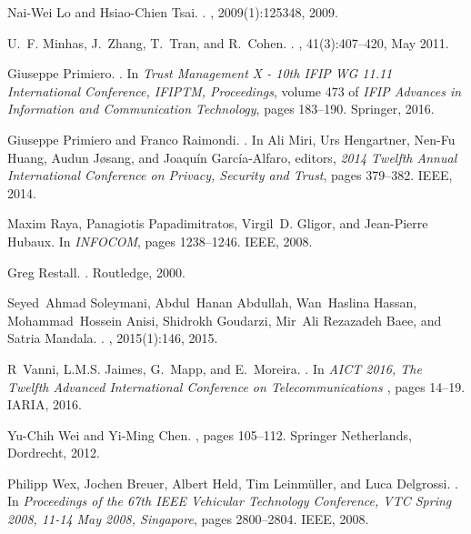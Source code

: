 \documentclass[compsoc, conference, letterpaper, 10pt, times]{IEEEtran}
\begin{document}
\begin{thebibliography}{10}
Nai-Wei Lo and Hsiao-Chien Tsai.
.
,
  2009(1):125348, 2009.

U.~F. Minhas, J.~Zhang, T.~Tran, and R.~Cohen.
.
, 41(3):407--420, May 2011.

Giuseppe Primiero.
.
\newblock In {\em {Trust Management {X} - 10th {IFIP} {WG}
  11.11 International Conference, {IFIPTM}, Proceedings}}, volume 473 of {\em {{IFIP} Advances in
  Information and Communication Technology}}, pages 183--190. Springer, 2016.

Giuseppe Primiero and Franco Raimondi.
.
\newblock In Ali Miri, Urs Hengartner, Nen{-}Fu Huang, Audun J{\o}sang, and
  Joaqu{\'i}n Garc{\'i}a{-}Alfaro, editors, {\em {2014 Twelfth Annual
  International Conference on Privacy, Security and Trust}}, pages 379--382. {IEEE}, 2014.

Maxim Raya, Panagiotis Papadimitratos, Virgil~D. Gligor, and Jean-Pierre
  Hubaux.
\newblock In {\em {INFOCOM}}, pages 1238--1246. IEEE, 2008.

Greg Restall.
.
\newblock Routledge, 2000.

Seyed~Ahmad Soleymani, Abdul~Hanan Abdullah, Wan~Haslina Hassan,
  Mohammad~Hossein Anisi, Shidrokh Goudarzi, Mir~Ali {Rezazadeh Baee}, and
  Satria Mandala.
.
,
  2015(1):146, 2015.

R~Vanni, L.M.S. Jaimes, G.~Mapp, and E.~Moreira.
.
\newblock In {\em {AICT 2016, The Twelfth Advanced International Conference on
  Telecommunications }}, pages 14--19. IARIA, 2016.

Yu-Chih Wei and Yi-Ming Chen.
, pages 105--112.
\newblock Springer Netherlands, Dordrecht, 2012.

Philipp Wex, Jochen Breuer, Albert Held, Tim Leinm{\"u}ller, and Luca
  Delgrossi.
.
\newblock In {\em {Proceedings of the 67th {IEEE} Vehicular Technology
  Conference, {VTC} Spring 2008, 11-14 May 2008, Singapore}}, pages 2800--2804.
  {IEEE}, 2008.

\end{thebibliography}
\end{document}
